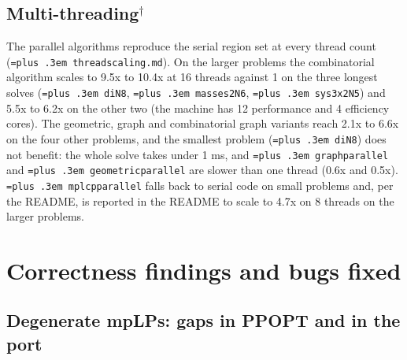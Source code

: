 \documentclass[10pt,a4paper]{article}
\newcommand{\busy}{$^\dagger$}
\newcommand{\sizenote}{Size is $n_\theta/n_x/m$: parameters, variables, constraints (Table~\ref{tab:sizes}).}
\newcommand{\ppopt}{PPOPT}
\newcommand{\code}[1]{{\let\_\bu\texttt{\spaceskip=\fontdimen2\font plus .3em #1}}}
\newcommand{\bu}{\textunderscore\hspace{0pt}}
\begin{document}
\subsection{Multi-threading\busy{}}
\label{sec:threads}

The parallel algorithms reproduce the serial region set at every thread count (\code{thread\_scaling.md}). On the larger problems the combinatorial algorithm scales to 9.5x to 10.4x
at 16 threads against 1 on the three longest solves (\code{di\_N8}, \code{masses2\_N6}, \code{sys3x2\_N5}) and 5.5x to 6.2x on the other two (the machine has 12 performance and 4 efficiency cores). The geometric, graph and combinatorial graph variants reach 2.1x to 6.6x
on the four other problems, and the smallest problem (\code{di\_N8}) does not benefit: the whole solve takes under 1 ms, and \code{graph\_parallel} and \code{geometric\_parallel} are slower than one thread (0.6x and 0.5x). \code{mplcp\_parallel}
falls back to serial code on small problems and, per the README, is reported in the README to scale to 4.7x on 8 threads on the larger problems.

\begin{table}[!htbp]
\centering\small\setlength{\tabcolsep}{4pt}
\caption{Thread scaling\busy{}: solve time in ms (\code{thread\_scaling.md}). ``serial'' is the serial algorithm on one thread; the next columns are the parallel code at the given thread count. \sizenote}
\label{tab:threads}

\end{table}

\section{Correctness findings and bugs fixed}
\label{sec:correctness}

\subsection{Degenerate mpLPs: gaps in \ppopt{} and in the port}
\end{document}
